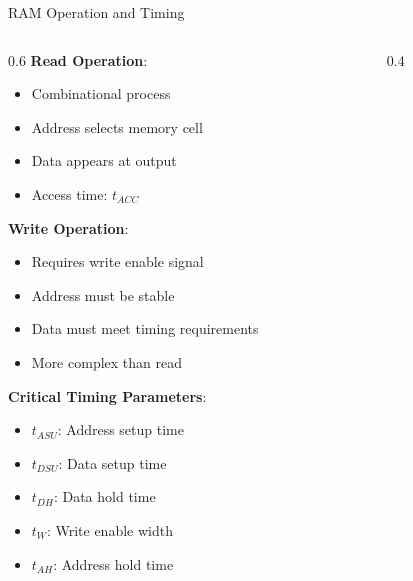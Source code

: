 \documentclass[aspectratio=169,11pt]{beamer}
\newcommand{\concept}[1]{\textbf{\color{accentcolor}#1}}
\begin{document}
\begin{frame}{RAM Operation and Timing}
\begin{columns}
\begin{column}{0.6\textwidth}
\concept{Read Operation}:
\begin{itemize}
\item Combinational process
\item Address selects memory cell
\item Data appears at output
\item Access time: $t_{ACC}$
\end{itemize}
\vspace{0.3cm}
\concept{Write Operation}:
\begin{itemize}
\item Requires write enable signal
\item Address must be stable
\item Data must meet timing requirements
\item More complex than read
\end{itemize}
\vspace{0.3cm}
\concept{Critical Timing Parameters}:
\begin{itemize}
\item $t_{ASU}$: Address setup time
\item $t_{DSU}$: Data setup time
\item $t_{DH}$: Data hold time
\item $t_{W}$: Write enable width
\item $t_{AH}$: Address hold time
\end{itemize}
\end{column}
\begin{column}{0.4\textwidth}
\begin{center}

\end{center}
\end{column}
\end{columns}
\end{frame}
\end{document}
